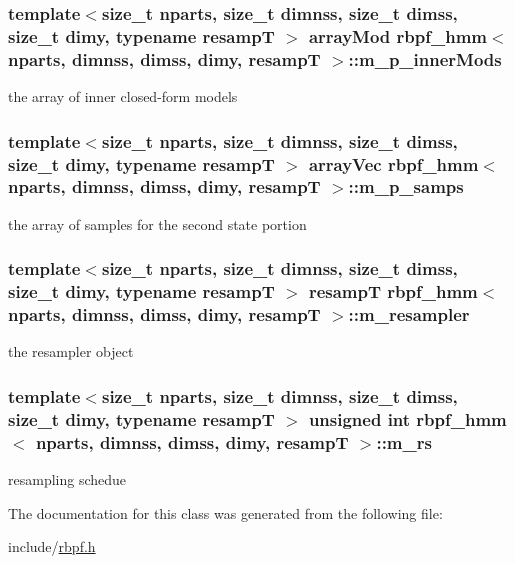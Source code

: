 \subsubsection[{\texorpdfstring{m\+\_\+p\+\_\+inner\+Mods}{m_p_innerMods}}]{\setlength{\rightskip}{0pt plus 5cm}template$<$size\+\_\+t nparts, size\+\_\+t dimnss, size\+\_\+t dimss, size\+\_\+t dimy, typename resampT $>$ {\bf array\+Mod} {\bf rbpf\+\_\+hmm}$<$ nparts, dimnss, dimss, dimy, resampT $>$\+::m\+\_\+p\+\_\+inner\+Mods\hspace{0.3cm}{\ttfamily [private]}}\hypertarget{classrbpf__hmm_a8f6bb61b659415364e81c3286e92e180}{}\label{classrbpf__hmm_a8f6bb61b659415364e81c3286e92e180}
the array of inner closed-\/form models 
\subsubsection[{\texorpdfstring{m\+\_\+p\+\_\+samps}{m_p_samps}}]{\setlength{\rightskip}{0pt plus 5cm}template$<$size\+\_\+t nparts, size\+\_\+t dimnss, size\+\_\+t dimss, size\+\_\+t dimy, typename resampT $>$ {\bf array\+Vec} {\bf rbpf\+\_\+hmm}$<$ nparts, dimnss, dimss, dimy, resampT $>$\+::m\+\_\+p\+\_\+samps\hspace{0.3cm}{\ttfamily [private]}}\hypertarget{classrbpf__hmm_ab64da08863b466fb14c0bcb2a2cbec70}{}\label{classrbpf__hmm_ab64da08863b466fb14c0bcb2a2cbec70}
the array of samples for the second state portion 
\subsubsection[{\texorpdfstring{m\+\_\+resampler}{m_resampler}}]{\setlength{\rightskip}{0pt plus 5cm}template$<$size\+\_\+t nparts, size\+\_\+t dimnss, size\+\_\+t dimss, size\+\_\+t dimy, typename resampT $>$ resampT {\bf rbpf\+\_\+hmm}$<$ nparts, dimnss, dimss, dimy, resampT $>$\+::m\+\_\+resampler\hspace{0.3cm}{\ttfamily [private]}}\hypertarget{classrbpf__hmm_af89d83ded78477186aab75c045112901}{}\label{classrbpf__hmm_af89d83ded78477186aab75c045112901}
the resampler object 
\subsubsection[{\texorpdfstring{m\+\_\+rs}{m_rs}}]{\setlength{\rightskip}{0pt plus 5cm}template$<$size\+\_\+t nparts, size\+\_\+t dimnss, size\+\_\+t dimss, size\+\_\+t dimy, typename resampT $>$ unsigned int {\bf rbpf\+\_\+hmm}$<$ nparts, dimnss, dimss, dimy, resampT $>$\+::m\+\_\+rs\hspace{0.3cm}{\ttfamily [private]}}\hypertarget{classrbpf__hmm_a9f26da56457265fae51fdc56e8356f68}{}\label{classrbpf__hmm_a9f26da56457265fae51fdc56e8356f68}
resampling schedue 

The documentation for this class was generated from the following file\+:\begin{DoxyCompactItemize}
\item 
include/\hyperlink{rbpf_8h}{rbpf.\+h}\end{DoxyCompactItemize}
